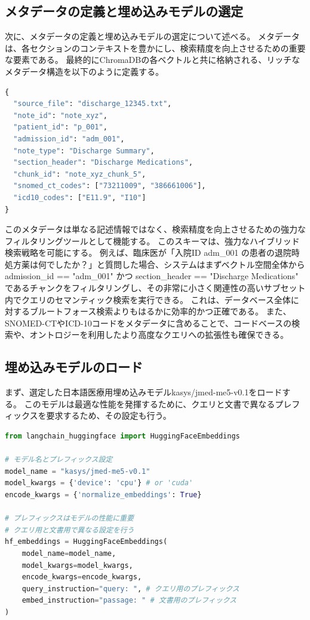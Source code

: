 \documentclass[12pt,a4paper]{jsarticle}
\begin{document}
\subsection{メタデータの定義と埋め込みモデルの選定}
次に、メタデータの定義と埋め込みモデルの選定について述べる。
メタデータは、各セクションのコンテキストを豊かにし、検索精度を向上させるための重要な要素である。
最終的にChromaDBの各ベクトルと共に格納される、リッチなメタデータ構造を以下のように定義する。
\begin{lstlisting}[language=Python, label=lst:JSON, caption=提案スキーマ (JSON形式)]
{
  "source_file": "discharge_12345.txt",
  "note_id": "note_xyz",
  "patient_id": "p_001",
  "admission_id": "adm_001",
  "note_type": "Discharge Summary",
  "section_header": "Discharge Medications",
  "chunk_id": "note_xyz_chunk_5",
  "snomed_ct_codes": ["73211009", "386661006"],
  "icd10_codes": ["E11.9", "I10"]
}
\end{lstlisting}
このメタデータは単なる記述情報ではなく、検索精度を向上させるための強力なフィルタリングツールとして機能する。
このスキーマは、強力なハイブリッド検索戦略を可能にする。
例えば、臨床医が「入院ID adm\_001 の患者の退院時処方薬は何でしたか？」と質問した場合、システムはまずベクトル空間全体からadmission\_id == "adm\_001" かつ section\_header == "Discharge Medications" であるチャンクをフィルタリングし、その非常に小さく関連性の高いサブセット内でクエリのセマンティック検索を実行できる。
これは、データベース全体に対するブルートフォース検索よりもはるかに効率的かつ正確である。
また、SNOMED-CTやICD-10コードをメタデータに含めることで、コードベースの検索や、オントロジーを利用したより高度なクエリへの拡張性も確保できる。

\subsection{埋め込みモデルのロード}
まず、選定した日本語医療用埋め込みモデルkasys/jmed-me5-v0.1をロードする。
このモデルは最適な性能を発揮するために、クエリと文書で異なるプレフィックスを要求するため、その設定も行う。
\begin{lstlisting}[language=Python, label=lst:loadmodel, caption=埋め込みモデルのロード]
from langchain_huggingface import HuggingFaceEmbeddings

# モデル名とプレフィックス設定
model_name = "kasys/jmed-me5-v0.1"
model_kwargs = {'device': 'cpu'} # or 'cuda'
encode_kwargs = {'normalize_embeddings': True}

# プレフィックスはモデルの性能に重要
# クエリ用と文書用で異なる設定を行う
hf_embeddings = HuggingFaceEmbeddings(
    model_name=model_name,
    model_kwargs=model_kwargs,
    encode_kwargs=encode_kwargs,
    query_instruction="query: ", # クエリ用のプレフィックス
    embed_instruction="passage: " # 文書用のプレフィックス
)
\end{lstlisting}
\end{document}
